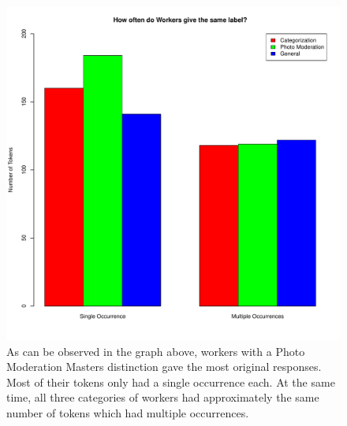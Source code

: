 \documentclass{chi2012}
\begin{document}
 \begin{figure}
\centering
\includegraphics[width=0.9\columnwidth]{extendedAbstractOccurrence}
\caption{As can be observed in the graph above, workers with a Photo Moderation Masters distinction gave the most original responses. Most of their tokens only had a single occurrence each. At the same time, all three categories of workers had approximately the same number of tokens which had multiple occurrences. }
\label{fig:figure1}
\end{figure}
 
\end{document}
